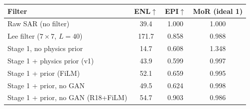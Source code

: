 \begin{tabular}{lccc}
\toprule
Filter & ENL$\uparrow$ & EPI$\uparrow$ & MoR (ideal 1) \\
\midrule
Raw SAR (no filter) & 39.4 & 1.000 & 1.000 \\
Lee filter ($7{\times}7$, $L{=}40$) & 171.7 & 0.858 & 0.988 \\
Stage 1, no physics prior & 14.7 & 0.608 & 1.348 \\
Stage 1 + physics prior (v1) & 43.9 & 0.599 & 0.997 \\
Stage 1 + prior (FiLM) & 52.1 & 0.659 & 0.995 \\
Stage 1 + prior, no GAN & 49.5 & 0.624 & 0.998 \\
Stage 1 + prior, no GAN (R18+FiLM) & 54.7 & 0.903 & 0.986 \\
\bottomrule
\end{tabular}